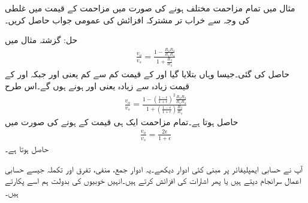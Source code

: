 مثال  میں تمام مزاحمت مختلف ہونے کی صورت میں مزاحمت کے قیمت میں غلطی کی وجہ سے خراب تر مشترکہ افزائش کی عمومی جواب حاصل کریں۔

حل:
گزشتہ مثال میں 
\begin{align*}
\frac{v_o}{v_s}=\frac{1-\frac{R_2R_3}{R_1 R_4}}{1+\frac{R_3}{R_4}}
\end{align*}
حاصل کی گئی۔جیسا وہاں بتلایا گیا  اور  کے قیمت کم سے کم یعنی  اور  جبکہ  اور  کے قیمت زیادہ سے زیادہ یعنی  اور
  ہونے ہوں گے۔اس طرح
\begin{align*}
\frac{v_o}{v_s}=\frac{1-\left(\frac{1-\epsilon}{1+\epsilon}\right)^2\frac{R_2R_3}{R_1 R_4}}{1+\left(\frac{1-\epsilon}{1+\epsilon}\right)\frac{R_3}{R_4}}
\end{align*}
حاصل ہوتا ہے۔تمام مزاحمت ایک ہی قیمت کے ہونے کی صورت میں
\begin{align*}
\frac{v_o}{v_s}=\frac{2 \epsilon}{1+\epsilon}
\end{align*}
حاصل ہوتا ہے۔


آپ نے حسابی ایمپلیفائر پر مبنی کئی ادوار دیکھے۔یہ ادوار جمع، منفی، تفرق اور تکملہ جیسے حسابی اعمال سرانجام دیتے ہیں یا پھر اشارات کی افزائش کرتے ہیں۔انہیں خوبیوں کی بدولت ہم اسے   پکارتے ہیں۔

